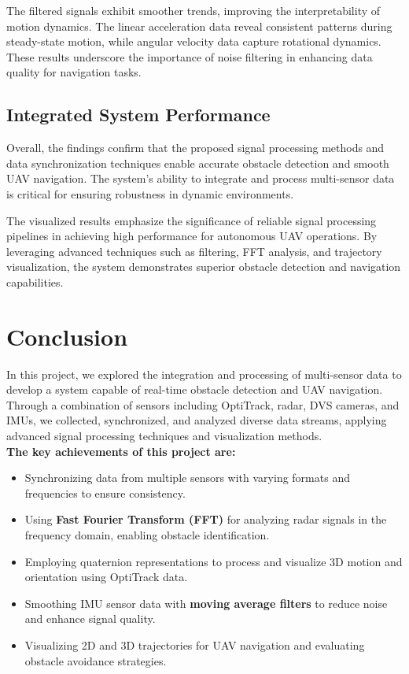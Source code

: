 \documentclass[12pt,a4paper]{article}
\begin{document}
The filtered signals exhibit smoother trends, improving the interpretability of motion dynamics. The linear acceleration data reveal consistent patterns during steady-state motion, while angular velocity data capture rotational dynamics. These results underscore the importance of noise filtering in enhancing data quality for navigation tasks.

\subsection{Integrated System Performance}

Overall, the findings confirm that the proposed signal processing methods and data synchronization techniques enable accurate obstacle detection and smooth UAV navigation. The system's ability to integrate and process multi-sensor data is critical for ensuring robustness in dynamic environments. 

The visualized results emphasize the significance of reliable signal processing pipelines in achieving high performance for autonomous UAV operations. By leveraging advanced techniques such as filtering, FFT analysis, and trajectory visualization, the system demonstrates superior obstacle detection and navigation capabilities.

\section{Conclusion}

 In this project, we explored the integration and processing of multi-sensor data to develop a system capable of real-time obstacle detection and UAV navigation. Through a combination of sensors including OptiTrack, radar, DVS cameras, and IMUs, we collected, synchronized, and analyzed diverse data streams, applying advanced signal processing techniques and visualization methods. \\

\textbf{The key achievements of this project are:}
\begin{itemize}
    \item Synchronizing data from multiple sensors with varying formats and frequencies to ensure consistency.
    \item Using \textbf{Fast Fourier Transform (FFT)} for analyzing radar signals in the frequency domain, enabling obstacle identification.
    \item Employing quaternion representations to process and visualize 3D motion and orientation using OptiTrack data.
    \item Smoothing IMU sensor data with \textbf{moving average filters} to reduce noise and enhance signal quality.
    \item Visualizing 2D and 3D trajectories for UAV navigation and evaluating obstacle avoidance strategies.
\end{itemize}
\end{document}
